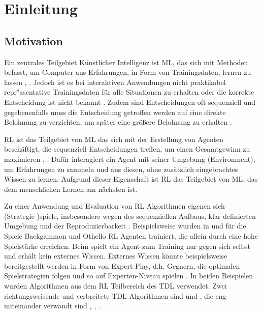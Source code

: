\chapter{Einleitung}
\section{Motivation}
Ein zentrales Teilgebiet Künstlicher Intelligenz ist \ac{ML}, das sich mit Methoden befasst, um Computer aus Erfahrungen, in Form von Trainingsdaten, lernen zu lassen \cite[S. 178]{ertelIntroductionArtificialIntelligence2017}, \cite[S. 524]{russellArtificialIntelligenceModern2021}. 
Jedoch ist es bei interaktiven Anwendungen nicht praktikabel repr"asentative Trainingsdaten für alle Situationen zu erhalten oder die korrekte Entscheidung ist nicht bekannt \cite[S. 24]{suttonReinforcementLearningIntroduction2018}.  
Zudem sind Entscheidungen oft sequenziell und gegebenenfalls muss die Entscheidung getroffen werden auf eine direkte Belohnung zu verzichten, um später eine größere Belohnung zu erhalten \cite[S. 1]{vanderreeReinforcementLearningGame2013}. 

\ac{RL} ist das Teilgebiet von \ac{ML} das sich mit der Erstellung von Agenten beschäftigt, die sequenziell Entscheidungen treffen, um einen Gesamtgewinn zu maximieren \cite[S. 1]{vanderreeReinforcementLearningGame2013}, \cite[S. 1]{suttonReinforcementLearningIntroduction2018}.  
Dafür interagiert ein Agent mit seiner Umgebung (\engl Environment), um Erfahrungen zu sammeln und aus diesen, ohne zusätzlich eingebrachtes Wissen zu lernen. 
Aufgrund dieser Eigenschaft ist \ac{RL} das Teilgebiet von \ac{ML}, das dem menschlichen Lernen am nächsten ist. \cite[S. 4]{suttonReinforcementLearningIntroduction2018}

Zu einer Anwendung und Evaluation von \ac{RL} Algorithmen eigenen sich (Strategie-)spiele, insbesondere wegen des sequenziellen Aufbaus, klar definierten Umgebung und der Reproduzierbarkeit \cite[S. 1]{vanderreeReinforcementLearningGame2013}.
Beispielsweise wurden in \cite{tesauroTemporalDifferenceLearning1992a} und \cite{vanderreeReinforcementLearningGame2013} für die Spiele Backgammon und Othello \ac{RL} Agenten trainiert, die allein durch \splay eine hohe Spielstärke erreichen. 
Beim \splay spielt ein Agent zum Training nur gegen sich selbst und erhält kein externes Wissen. 
Externes Wissen könnte beispielsweise bereitgestellt werden in Form von Expert Play, d.h. Gegnern, die optimalen Spielstrategien folgen und so auf Experten-Niveau spielen \cite[S. 561]{szitaReinforcementLearningGames2012}. 
In beiden Beispielen wurden Algorithmen aus dem \ac{RL} Teilbereich des \ac{TDL} verwendet. 
Zwei richtungsweisende und verbreitete \ac{TDL} Algorithmen sind \qlearning und \sarsa, die eng miteinander verwandt sind \cite[S. 138]{suttonReinforcementLearningIntroduction2018}, \cite[S. 1]{vanderreeReinforcementLearningGame2013}, \cite[S. 1]{samsudenReviewPaperImplementing2019}.

